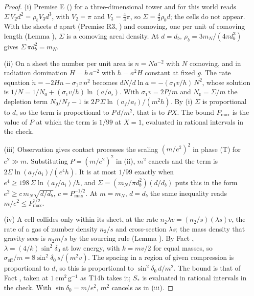 \begin{proof}
(i) Premise E () for a three-dimensional tower and for this world reads $\Sigma\,V_{2}d^{2} = \rho_{b}V_{3}d^{3}$, with $V_{2} = \pi$ and $V_{3} = \tfrac{4}{3}\pi$, so $\Sigma = \tfrac{4}{3}\rho_{b}d$; the cells do not appear. With the sheets $d$ apart (Premise R3, ) and comoving, one per unit of comoving length (Lemma ), $\Sigma$ is a comoving areal density. At $d = d_{b}$, $\rho_{b} = 3m_{N}/(4\pi d_{b}^{3})$ gives $\Sigma\,\pi d_{b}^{2} = m_{N}$.

(ii) On a sheet the number per unit area is $n = N a^{-2}$ with $N$ comoving, and in radiation domination $H = h\,a^{-2}$ with $h = a^{2}H$ constant at fixed $g$. The rate equation $\dot n = -2Hn - \sigma_{1}v\,n^{2}$ becomes $dN/d\ln a = -(\sigma_{1}v/h)\,N^{2}$, whose solution is $1/N = 1/N_{0} + (\sigma_{1}v/h)\ln(a/a_{i})$. With $\sigma_{1}v = 2P/m$ and $N_{0} = \Sigma/m$ the depletion term $N_{0}/N_{f} - 1$ is $2P\,\Sigma\ln(a_{f}/a_{i})/(m^{2}h)$. By (i) $\Sigma$ is proportional to $d$, so the term is proportional to $P\,d/m^{2}$, that is to $P X$. The bound $P_{\max}$ is the value of $P$ at which the term is $1/99$ at $X = 1$, evaluated in rational intervals in the check.

(iii) Observation  gives contact processes the scaling $(m/e^{2})^{2}$ in phase (T) for $e^{2} \gg m$. Substituting $P = (m/e^{2})^{2}$ in (ii), $m^{2}$ cancels and the term is $2\Sigma\ln(a_{f}/a_{i})/(e^{4}h)$. It is at most $1/99$ exactly when $e^{4} \ge 198\,\Sigma\ln(a_{f}/a_{i})/h$, and $\Sigma = (m_{N}/\pi d_{b}^{2})(d/d_{b})$ puts this in the form $e^{2} \ge c\,m_{N}\sqrt{d/d_{b}}$, $c = P_{\max}^{-1/2}$. At $m = m_{N}$, $d = d_{b}$ the same inequality reads $m/e^{2} \le P_{\max}^{1/2}$.

(iv) A cell collides only within its sheet, at the rate $n_{2}\lambda v = (n_{2}/s)(\lambda s)v$, the rate of a gas of number density $n_{2}/s$ and cross-section $\lambda s$; the mass density that gravity sees is $n_{2}m/s$ by the sourcing rule (Lemma ). By Fact , $\lambda = (4/k)\sin^{2}\delta_{0}$ at low energy, with $k = mv/2$ for equal masses, so $\sigma_{\mathrm{eff}}/m = 8\sin^{2}\delta_{0}\,s/(m^{2}v)$. The spacing in a region of given compression is proportional to $d$, so this is proportional to $\sin^{2}\delta_{0}\,d/m^{2}$. The bound is that of Fact , taken at $1\ \mathrm{cm^{2}\,g^{-1}}$ as T14b takes it; $S_{*}$ is evaluated in rational intervals in the check. With $\sin\delta_{0} = m/e^{2}$, $m^{2}$ cancels as in (iii).


\end{proof}
